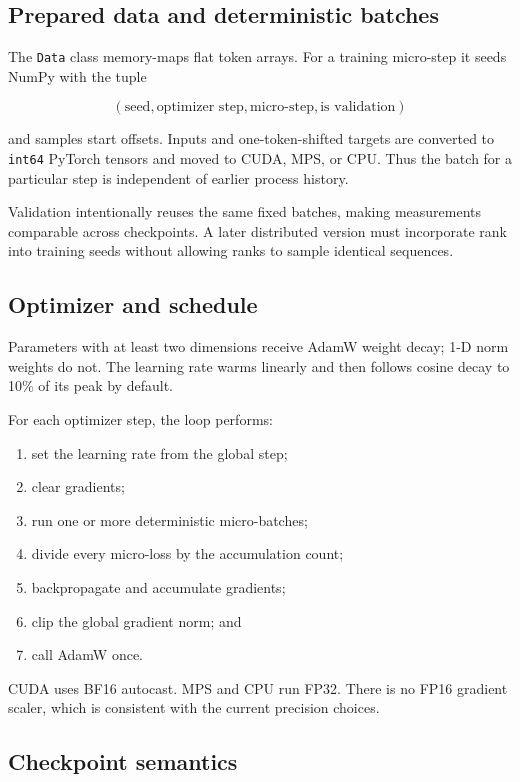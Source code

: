 \subsection{Prepared data and deterministic batches}

The \texttt{Data} class memory-maps flat token arrays. For a training micro-step
it seeds NumPy with the tuple

\[
  (\text{seed},\text{optimizer step},\text{micro-step},\text{is validation})
\]

and samples start offsets. Inputs and one-token-shifted targets are converted to
\texttt{int64} PyTorch tensors and moved to CUDA, MPS, or CPU. Thus
the batch for
a particular step is independent of earlier process history.

Validation intentionally reuses the same fixed batches, making measurements
comparable across checkpoints. A later distributed version must incorporate
rank into training seeds without allowing ranks to sample identical sequences.

\subsection{Optimizer and schedule}

Parameters with at least two dimensions receive AdamW weight decay; 1-D norm
weights do not. The learning rate warms linearly and then follows cosine decay
to 10\% of its peak by default.

For each optimizer step, the loop performs:

\begin{enumerate}
    \setlength{\itemsep}{0pt}
  \item set the learning rate from the global step;
  \item clear gradients;
  \item run one or more deterministic micro-batches;
  \item divide every micro-loss by the accumulation count;
  \item backpropagate and accumulate gradients;
  \item clip the global gradient norm; and
  \item call AdamW once.
\end{enumerate}

CUDA uses BF16 autocast. MPS and CPU run FP32. There is no FP16 gradient scaler,
which is consistent with the current precision choices.

\subsection{Checkpoint semantics}

